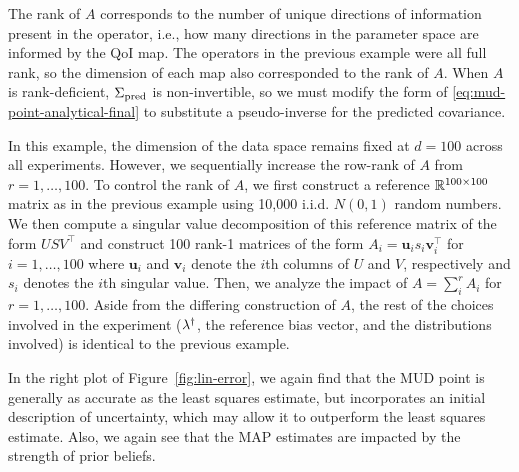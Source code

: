 The rank of $A$ corresponds to the number of unique directions of information present in the operator, i.e., how many directions in the parameter space are informed by the QoI map.
The operators in the previous example were all full rank, so the dimension of each map also corresponded to the rank of $A$.
When $A$ is rank-deficient, $\Sigma_\text{pred}$ is non-invertible, so we must modify the form of \eqref{eq:mud-point-analytical-final} to substitute a pseudo-inverse for the predicted covariance.


In this example, the dimension of the data space remains fixed at $d=100$ across all experiments.
However, we sequentially increase the row-rank of $A$ from $r=1, \ldots, 100$.
To control the rank of $A$, we first construct a reference $\mathbb{R}^{100\times 100}$ matrix as in the previous example using 10,000 i.i.d. $N(0,1)$ random numbers.
We then compute a singular value decomposition of this reference matrix of the form $USV^\top$ and construct 100 rank-1 matrices of the form $A_i=\mathbf{u}_i s_i \mathbf{v}_i^\top$ for $i=1,\ldots,100$ where $\mathbf{u}_i$ and $\mathbf{v}_i$ denote the $i$th columns of $U$ and $V$, respectively and $s_i$ denotes the $i$th singular value.
Then, we analyze the impact of $A = \sum_i^r A_i$ for $r=1,\ldots,100$.
Aside from the differing construction of $A$, the rest of the choices involved in the experiment ($\lambda^\dagger$, the reference bias vector, and the distributions involved) is identical to the previous example.

In the right plot of Figure~\ref{fig:lin-error}, we
again find that the MUD point is generally as accurate as the least squares estimate, but incorporates an initial description of uncertainty, which may allow it to outperform the least squares estimate.
Also, we again see that the MAP estimates are impacted by the strength of prior beliefs.



